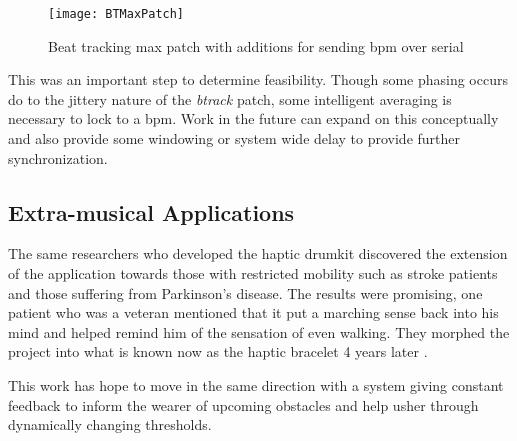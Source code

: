 \begin{figure}[H]
    \centering
    \texttt{[image: BTMaxPatch]}
    \caption{Beat tracking max patch with additions for sending bpm over serial}
    \label{fig:BTMaxPatch}
\end{figure}

This was an important step to determine feasibility. Though some phasing occurs do to the jittery nature of the \textit{btrack} patch, some intelligent averaging is necessary to lock to a bpm. Work in the future can expand on this conceptually and also provide some windowing or system wide delay to provide further synchronization.

\subsection{Extra-musical Applications}
The same researchers who developed the haptic drumkit discovered the extension of the application towards those with restricted mobility such as stroke patients and those suffering from Parkinson's disease. The results were promising, one patient who was a veteran mentioned that it put a marching sense back into his mind and helped remind him of the sensation of even walking. They morphed the project into what is known now as the haptic bracelet 4 years later \cite{holland2014gait}.

This work has hope to move in the same direction with a system giving constant feedback to inform the wearer of upcoming obstacles and help usher through dynamically changing thresholds.